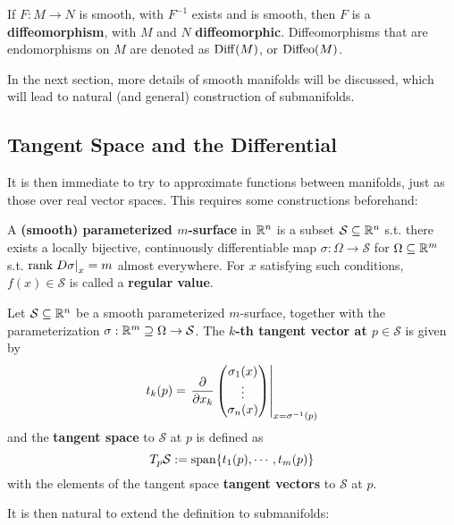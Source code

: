 \documentclass{article}
\begin{document}
\begin{definition}
    If $F: M \to N$ is smooth, with $F^{-1}$ exists and is smooth, then $F$ is a \textbf{diffeomorphism}, with $M$ and $N$ \textbf{diffeomorphic}. Diffeomorphisms that are endomorphisms on $M$ are denoted as $\mathrm{Diff}(M)$, or $\mathrm{Diffeo}(M)$.
\end{definition}

In the next section, more details of smooth manifolds will be discussed, which will lead to natural (and general) construction of submanifolds.

\subsection{Tangent Space and the Differential}

It is then immediate to try to approximate functions between manifolds, just as those over real vector spaces. This requires some constructions beforehand:

\begin{definition}
    A \textbf{(smooth) parameterized $m$-surface} in $\mathbb{R}^n$ is a subset $\mathcal{S} \subseteq \mathbb{R}^n$ s.t. there exists a locally bijective, continuously differentiable map $\sigma: \Omega \to \mathcal{S}$ for $\Omega \subseteq \mathbb{R}^m$ s.t. $\mathrm{rank} \left.D\sigma\right|_{x} = m$ almost everywhere. For $x$ satisfying such conditions, $f(x) \in \mathcal{S}$ is called a \textbf{regular value}.
\end{definition}

\begin{definition}
    Let $\mathcal{S} \subseteq \mathbb{R}^n$ be a smooth parameterized $m$-surface, together with the parameterization $\sigma: \mathbb{R}^m \supseteq \Omega \to \mathcal{S}$. The \textbf{$k$-th tangent vector at $p \in \mathcal{S}$} is given by
    \[
        t_k(p) = \left.\frac{\partial}{\partial x_k} \begin{pmatrix} \sigma_1(x) \\ \vdots \\ \sigma_n(x) \end{pmatrix}\right|_{x = \sigma^{-1}(p)}
    \]
    and the \textbf{tangent space} to $\mathcal{S}$ at $p$ is defined as
    \[
        T_p \mathcal{S} := \mathrm{span}\{ t_1(p), \cdots, t_m(p)\}
    \]
    with the elements of the tangent space \textbf{tangent vectors} to $\mathcal{S}$ at $p$.
\end{definition}

It is then natural to extend the definition to submanifolds:
\end{document}
